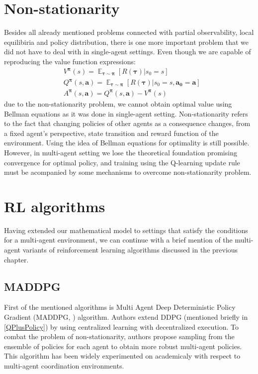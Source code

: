 \section{Non-stationarity}
Besides all already mentioned problems connected with partial observability, local equilibiria and policy distribution,
there is one more important problem that we did not have to deal with in single-agent settings.
Even though we are capable of reproducing the value function expressions:
\begin{align*}  
    &V^{\boldsymbol{\pi}}(s) = \mathop{\mathbb{E}}_{\boldsymbol{\tau} \sim \boldsymbol{\pi}}[R(\boldsymbol{\tau})|s_0=s] \\
    &Q^{\boldsymbol{\pi}}(s,\boldsymbol{a}) = \mathop{\mathbb{E}}_{\boldsymbol{\tau} \sim \boldsymbol{\pi}}[R(\boldsymbol{\tau})|s_0=s,\boldsymbol{a_0}=\boldsymbol{a}] \\ 
    &A^{\boldsymbol{\pi}}(s,\boldsymbol{a}) = Q^{\boldsymbol{\pi}}(s,\boldsymbol{a}) - V^{\boldsymbol{\pi}}(s)
\end{align*}
due to the non-stationarity problem, we cannot obtain optimal value using Bellman equations as it was done in single-agent setting.
Non-stationarity refers to the fact that changing policies of other agents as a consequence changes, from a fixed agent's perspective, state transition and reward function of the environment. 
Using the idea of Bellman equations for optimality is still possible.
However, in multi-agent setting we lose the theoretical foundation promising convergence for optimal policy, and training using the Q-learning update rule must be acompanied by some mechanisms to overcome non-stationarity problem.

\section{RL algorithms}
Having extended our mathematical model to settings that satisfy the conditions for a multi-agent environment, we can continue with a brief mention of the multi-agent variants of reinforcement learning algorithms discussed in the previous chapter.
\subsection*{MADDPG}
First of the mentioned algorithms is Multi Agent Deep Deterministic Policy Gradient (MADDPG, \cite{MADDPG}) algorithm.
Authors extend DDPG (mentioned briefly in \ref{QPlusPolicy}) by using centralized learning with decentralized execution.
To combat the problem of non-stationarity, authors propose sampling from the ensemble of policies for each agent to obtain more robust multi-agent policies.
This algorithm has been widely experimented on academicaly with respect to multi-agent coordination environments.
